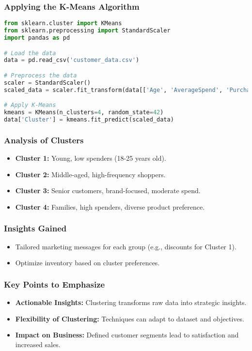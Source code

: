 \documentclass[aspectratio=169]{beamer}
\begin{document}
\begin{frame}[fragile]
    \frametitle{Applying the K-Means Algorithm}
    \begin{lstlisting}[language=Python]
from sklearn.cluster import KMeans
from sklearn.preprocessing import StandardScaler
import pandas as pd

# Load the data
data = pd.read_csv('customer_data.csv')

# Preprocess the data
scaler = StandardScaler()
scaled_data = scaler.fit_transform(data[['Age', 'AverageSpend', 'PurchaseFrequency']])

# Apply K-Means
kmeans = KMeans(n_clusters=4, random_state=42)
data['Cluster'] = kmeans.fit_predict(scaled_data)
    \end{lstlisting}
\end{frame}

\begin{frame}[fragile]
    \frametitle{Analysis of Clusters}
    \begin{itemize}
        \item \textbf{Cluster 1:} Young, low spenders (18-25 years old).
        \item \textbf{Cluster 2:} Middle-aged, high-frequency shoppers.
        \item \textbf{Cluster 3:} Senior customers, brand-focused, moderate spend.
        \item \textbf{Cluster 4:} Families, high spenders, diverse product preference.
    \end{itemize}
\end{frame}

\begin{frame}[fragile]
    \frametitle{Insights Gained}
    \begin{itemize}
        \item Tailored marketing messages for each group (e.g., discounts for Cluster 1).
        \item Optimize inventory based on cluster preferences.
    \end{itemize}
\end{frame}

\begin{frame}[fragile]
    \frametitle{Key Points to Emphasize}
    \begin{itemize}
        \item \textbf{Actionable Insights:} Clustering transforms raw data into strategic insights.
        \item \textbf{Flexibility of Clustering:} Techniques can adapt to dataset and objectives.
        \item \textbf{Impact on Business:} Defined customer segments lead to satisfaction and increased sales.
    \end{itemize}
\end{frame}
\end{document}

